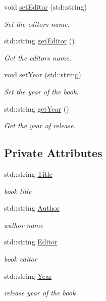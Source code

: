 \begin{DoxyCompactItemize}
void \hyperlink{classBook_a463af516921d49d46b730c455b2de0c3}{set\+Editor} (std\+::string)
\begin{DoxyCompactList}\small\item\em Set the editor\textquotesingle{}s name. \end{DoxyCompactList}\item 
std\+::string \hyperlink{classBook_a8df0e201c23d298f20bc4f36f74ac728}{get\+Editor} ()
\begin{DoxyCompactList}\small\item\em Get the editor\textquotesingle{}s name. \end{DoxyCompactList}\item 
void \hyperlink{classBook_a3383a947b8522adc83e16afecba914be}{set\+Year} (std\+::string)
\begin{DoxyCompactList}\small\item\em Set the year of the book. \end{DoxyCompactList}\item 
std\+::string \hyperlink{classBook_a933b321fec5c6c8bbe39e9d2c0b3de2d}{get\+Year} ()
\begin{DoxyCompactList}\small\item\em Get the year of release. \end{DoxyCompactList}\end{DoxyCompactItemize}
\subsection*{Private Attributes}
\begin{DoxyCompactItemize}
\item 
std\+::string \hyperlink{classBook_a862b94a2fd16ac90209afa4393d8df8a}{Title}
\begin{DoxyCompactList}\small\item\em book title \end{DoxyCompactList}\item 
std\+::string \hyperlink{classBook_a12872f571d8e7c5bfa31f4142e7848eb}{Author}
\begin{DoxyCompactList}\small\item\em author name \end{DoxyCompactList}\item 
std\+::string \hyperlink{classBook_a18602b69a54cf1533569ac857681b03f}{Editor}
\begin{DoxyCompactList}\small\item\em book editor \end{DoxyCompactList}\item 
std\+::string \hyperlink{classBook_ad3fc2c944e788d179c4d836f36662ae2}{Year}
\begin{DoxyCompactList}\small\item\em release year of the book \end{DoxyCompactList}\end{DoxyCompactItemize}



